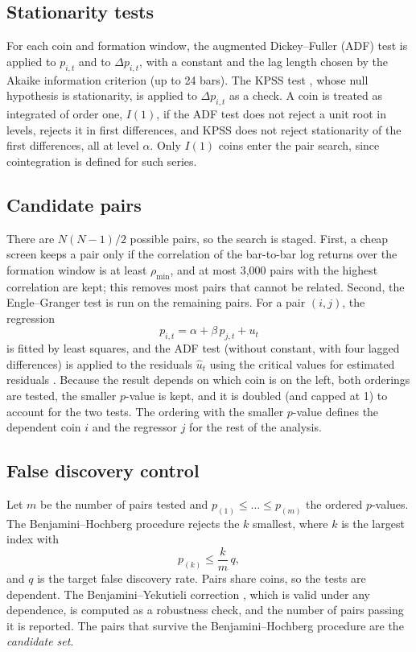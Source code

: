 \documentclass[10pt,a4paper,twocolumn]{article}
\begin{document}
	\subsection{Stationarity tests}
	\label{sec:stationarity}
	For each coin and formation window, the augmented Dickey--Fuller (ADF) test \cite{dickey1979} is applied to $p_{i,t}$ and to $\Delta p_{i,t}$, with a constant and the lag length chosen by the Akaike information criterion (up to 24 bars). The KPSS test \cite{kpss1992}, whose null hypothesis is stationarity, is applied to $\Delta p_{i,t}$ as a check. A coin is treated as integrated of order one, $I(1)$, if the ADF test does not reject a unit root in levels, rejects it in first differences, and KPSS does not reject stationarity of the first differences, all at level $\alpha$. Only $I(1)$ coins enter the pair search, since cointegration is defined for such series.
	
	\subsection{Candidate pairs}
	\label{sec:pairs}
	There are $N(N-1)/2$ possible pairs, so the search is staged. First, a cheap screen keeps a pair only if the correlation of the bar-to-bar log returns over the formation window is at least $\rho_{\min}$, and at most 3{,}000 pairs with the highest correlation are kept; this removes most pairs that cannot be related. Second, the Engle--Granger test \cite{engle1987} is run on the remaining pairs. For a pair $(i,j)$, the regression
	\begin{equation}
		p_{i,t}=\alpha+\beta\,p_{j,t}+u_t
		\label{eq:eg}
	\end{equation}
	is fitted by least squares, and the ADF test (without constant, with four lagged differences) is applied to the residuals $\hat u_t$ using the critical values for estimated residuals \cite{mackinnon1994}. Because the result depends on which coin is on the left, both orderings are tested, the smaller $p$-value is kept, and it is doubled (and capped at 1) to account for the two tests. The ordering with the smaller $p$-value defines the dependent coin $i$ and the regressor $j$ for the rest of the analysis.
	
	\subsection{False discovery control}
	\label{sec:fdr}
	Let $m$ be the number of pairs tested and $p_{(1)}\le\dots\le p_{(m)}$ the ordered $p$-values. The Benjamini--Hochberg procedure \cite{benjamini1995} rejects the $k$ smallest, where $k$ is the largest index with
	\begin{equation}
		p_{(k)}\le \frac{k}{m}\,q ,
		\label{eq:bh}
	\end{equation}
	and $q$ is the target false discovery rate. Pairs share coins, so the tests are dependent. The Benjamini--Yekutieli correction \cite{benjamini2001}, which is valid under any dependence, is computed as a robustness check, and the number of pairs passing it is reported. The pairs that survive the Benjamini--Hochberg procedure are the \emph{candidate set}.
	
\end{document}

